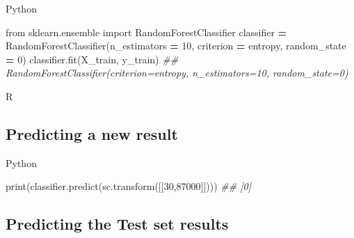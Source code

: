 \documentclass[
]{book}
\newenvironment{Shaded}{\begin{snugshade}}{\end{snugshade}}
\newcommand{\AttributeTok}[1]{\textcolor[rgb]{0.77,0.63,0.00}{#1}}
\newcommand{\BuiltInTok}[1]{#1}
\newcommand{\CommentTok}[1]{\textcolor[rgb]{0.56,0.35,0.01}{\textit{#1}}}
\newcommand{\DecValTok}[1]{\textcolor[rgb]{0.00,0.00,0.81}{#1}}
\newcommand{\FunctionTok}[1]{\textcolor[rgb]{0.00,0.00,0.00}{#1}}
\newcommand{\ImportTok}[1]{#1}
\newcommand{\NormalTok}[1]{#1}
\newcommand{\OperatorTok}[1]{\textcolor[rgb]{0.81,0.36,0.00}{\textbf{#1}}}
\newcommand{\OtherTok}[1]{\textcolor[rgb]{0.56,0.35,0.01}{#1}}
\newcommand{\SpecialCharTok}[1]{\textcolor[rgb]{0.00,0.00,0.00}{#1}}
\newcommand{\StringTok}[1]{\textcolor[rgb]{0.31,0.60,0.02}{#1}}
\theoremstyle{definition}
\theoremstyle{definition}
\theoremstyle{definition}
\theoremstyle{definition}
\theoremstyle{remark}
\begin{document}
Python

\begin{Shaded}
\begin{Highlighting}[]
\ImportTok{from}\NormalTok{ sklearn.ensemble }\ImportTok{import}\NormalTok{ RandomForestClassifier}
\NormalTok{classifier }\OperatorTok{=}\NormalTok{ RandomForestClassifier(n\_estimators }\OperatorTok{=} \DecValTok{10}\NormalTok{, criterion }\OperatorTok{=} \StringTok{\textquotesingle{}entropy\textquotesingle{}}\NormalTok{, random\_state }\OperatorTok{=} \DecValTok{0}\NormalTok{)}
\NormalTok{classifier.fit(X\_train, y\_train)}
\CommentTok{\#\# RandomForestClassifier(criterion=\textquotesingle{}entropy\textquotesingle{}, n\_estimators=10, random\_state=0)}
\end{Highlighting}
\end{Shaded}

R

\begin{Shaded}
\end{Shaded}

\hypertarget{predicting-a-new-result-9}{%
\subsection{Predicting a new result}\label{predicting-a-new-result-9}}

Python

\begin{Shaded}
\begin{Highlighting}[]
\BuiltInTok{print}\NormalTok{(classifier.predict(sc.transform([[}\DecValTok{30}\NormalTok{,}\DecValTok{87000}\NormalTok{]])))}
\CommentTok{\#\# [0]}
\end{Highlighting}
\end{Shaded}

\hypertarget{predicting-the-test-set-results-8}{%
\subsection{Predicting the Test set results}\label{predicting-the-test-set-results-8}}
\end{document}

